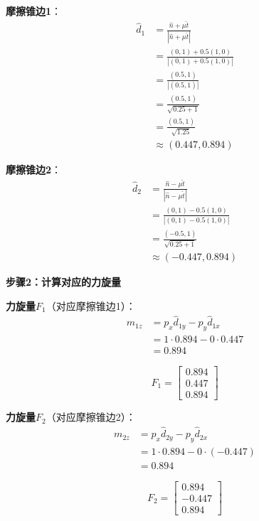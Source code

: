 \documentclass[12pt,a4paper]{article}
\begin{document}
\textbf{摩擦锥边1}：
\begin{align}
\hat{d}_1 &= \frac{\hat{n} + \mu \hat{t}}{|\hat{n} + \mu \hat{t}|} \\
&= \frac{(0, 1) + 0.5(1, 0)}{|(0, 1) + 0.5(1, 0)|} \\
&= \frac{(0.5, 1)}{|(0.5, 1)|} \\
&= \frac{(0.5, 1)}{\sqrt{0.25 + 1}} \\
&= \frac{(0.5, 1)}{\sqrt{1.25}} \\
&\approx (0.447, 0.894)
\end{align}

\textbf{摩擦锥边2}：
\begin{align}
\hat{d}_2 &= \frac{\hat{n} - \mu \hat{t}}{|\hat{n} - \mu \hat{t}|} \\
&= \frac{(0, 1) - 0.5(1, 0)}{|(0, 1) - 0.5(1, 0)|} \\
&= \frac{(-0.5, 1)}{\sqrt{0.25 + 1}} \\
&\approx (-0.447, 0.894)
\end{align}

\textbf{步骤2：计算对应的力旋量}

\textbf{力旋量$F_1$}（对应摩擦锥边1）：
\begin{align}
m_{1z} &= p_x \hat{d}_{1y} - p_y \hat{d}_{1x} \\
&= 1 \cdot 0.894 - 0 \cdot 0.447 \\
&= 0.894
\end{align}

\begin{equation}
F_1 = \begin{bmatrix} 0.894 \\ 0.447 \\ 0.894 \end{bmatrix}
\end{equation}

\textbf{力旋量$F_2$}（对应摩擦锥边2）：
\begin{align}
m_{2z} &= p_x \hat{d}_{2y} - p_y \hat{d}_{2x} \\
&= 1 \cdot 0.894 - 0 \cdot (-0.447) \\
&= 0.894
\end{align}

\begin{equation}
F_2 = \begin{bmatrix} 0.894 \\ -0.447 \\ 0.894 \end{bmatrix}
\end{equation}
\end{document}
